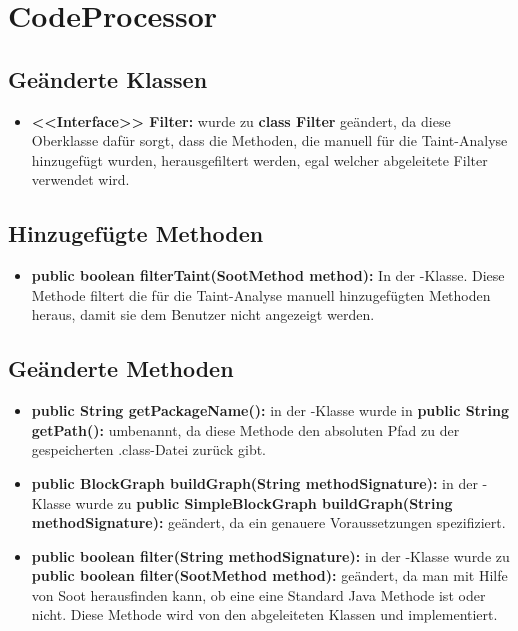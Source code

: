 \newpage 
\section{CodeProcessor}

\subsection{Geänderte Klassen}

\begin{itemize}
	\item \textbf{<<Interface>> Filter:} wurde zu \textbf{class Filter} geändert, da diese Oberklasse dafür sorgt, dass die Methoden, die manuell für die Taint-Analyse hinzugefügt wurden, herausgefiltert werden, egal welcher abgeleitete Filter verwendet wird.
\end{itemize}

\subsection{Hinzugefügte Methoden}

\begin{itemize}
	\item \textbf{public boolean filterTaint(SootMethod method):} In der -Klasse. Diese Methode filtert die für die Taint-Analyse manuell hinzugefügten Methoden heraus, damit sie dem Benutzer nicht angezeigt werden.
\end{itemize}

\subsection{Geänderte Methoden}

\begin{itemize}
	\item \textbf{public String getPackageName():} in der -Klasse wurde in \textbf{public String getPath():} umbenannt, da diese Methode den absoluten Pfad zu der gespeicherten .class-Datei zurück gibt.

	\item \textbf{public BlockGraph buildGraph(String methodSignature):} in der -Klasse wurde zu \textbf{public SimpleBlockGraph buildGraph(String methodSignature):} geändert, da ein  genauere Voraussetzungen spezifiziert.

	\item \textbf{public boolean filter(String methodSignature):} in der -Klasse wurde zu \textbf{public boolean filter(SootMethod method):} geändert, da man mit Hilfe von Soot herausfinden kann, ob eine  eine Standard Java Methode ist oder nicht. Diese Methode wird von den abgeleiteten Klassen  und  implementiert.
\end{itemize}

